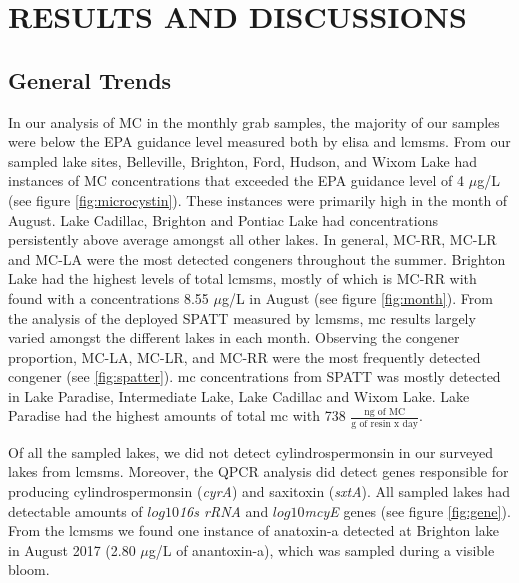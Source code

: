 \chapter{RESULTS AND DISCUSSIONS}
\section{General Trends}


In our analysis of MC in the monthly grab samples, the majority of our samples were below the EPA guidance level measured both by \gls{elisa} and \gls{lcmsms}. From our sampled lake sites, Belleville, Brighton, Ford, Hudson, and Wixom Lake had instances of MC concentrations that exceeded the EPA guidance level of 4 $\mu$g/L  (see figure \ref{fig:microcystin}). These instances were primarily high in the month of August. Lake Cadillac, Brighton and Pontiac Lake had concentrations persistently above average amongst all other lakes. In general, MC-RR, MC-LR and MC-LA were the most detected congeners throughout the summer. Brighton Lake had the highest levels of total \gls{lcmsms}, mostly of which is MC-RR with found with a concentrations 8.55 $\mu$g/L in August (see figure \ref{fig:month}). From the analysis of the deployed SPATT measured by \gls{lcmsms}, \gls{mc} results largely varied amongst the different lakes in each month. Observing the congener proportion, MC-LA, MC-LR, and MC-RR were the most frequently detected congener (see \ref{fig:spatter}). \gls{mc} concentrations from SPATT was mostly detected in Lake Paradise, Intermediate Lake, Lake Cadillac and Wixom Lake. Lake Paradise had the highest amounts of total \gls{mc} with 738 $\frac{\text{ng of MC}}{\text{g of resin x day}}$.  

Of all the sampled lakes, we did not detect cylindrospermonsin in our surveyed lakes from \gls{lcmsms}. Moreover, the QPCR analysis did detect genes responsible for producing cylindrospermonsin (\emph{cyrA}) and saxitoxin (\emph{sxtA}). All sampled lakes had detectable amounts of $log10$\emph{16s rRNA} and $log10$\emph{mcyE} genes (see figure \ref{fig:gene}).  From the \gls{lcmsms} we found one instance of anatoxin-a detected at Brighton lake in August 2017 (2.80 $\mu$g/L of anantoxin-a), which was sampled during a visible bloom. %


